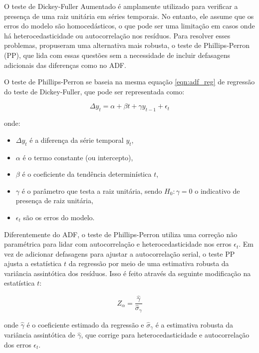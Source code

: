 \documentclass[12pt,oneside,a4paper,chapter=TITLE,english,brazil,sumario=abnt-6027-2012]{abntex2}
\begin{document}
O teste de Dickey-Fuller Aumentado é amplamente utilizado para verificar a presença de uma raiz unitária em séries temporais. No entanto, ele assume que os erros do modelo são homocedásticos, o que pode ser uma limitação em casos onde há heterocedasticidade ou autocorrelação nos resíduos. Para resolver esses problemas,  propuseram uma alternativa mais robusta, o teste de Phillips-Perron (PP), que lida com essas questões sem a necessidade de incluir defasagens adicionais das diferenças como no ADF.

O teste de Phillips-Perron se baseia na mesma equação \ref{eqn:adf_reg} de regressão do teste de Dickey-Fuller, que pode ser representada como:

\begin{equation}
	\label{eqn:adf_reg}
	\Delta y_t = \alpha + \beta t + \gamma y_{t-1} + \epsilon_t
\end{equation}

onde:

\begin{itemize}
	\item \( \Delta y_t \) é a diferença da série temporal \( y_t \),
	\item \( \alpha \) é o termo constante (ou intercepto),
	\item \( \beta \) é o coeficiente da tendência determinística \( t \),
	\item \( \gamma \) é o parâmetro que testa a raiz unitária, sendo \( H_0: \gamma = 0 \) o indicativo de presença de raiz unitária,
	\item \( \epsilon_t \) são os erros do modelo.
\end{itemize}

Diferentemente do ADF, o teste de Phillips-Perron utiliza uma correção não paramétrica para lidar com autocorrelação e heterocedasticidade nos erros \( \epsilon_t \). Em vez de adicionar defasagens para ajustar a autocorrelação serial, o teste PP ajusta a estatística \( t \) da regressão por meio de uma estimativa robusta da variância assintótica dos resíduos. Isso é feito através da seguinte modificação na estatística \( t \):

\[
	Z_\alpha = \frac{\hat{\gamma}}{\widehat{\sigma}_{\gamma}}
\]

onde \( \hat{\gamma} \) é o coeficiente estimado da regressão e \( \widehat{\sigma}_{\gamma} \) é a estimativa robusta da variância assintótica de \( \hat{\gamma} \), que corrige para heterocedasticidade e autocorrelação dos erros \( \epsilon_t \).
\end{document}
